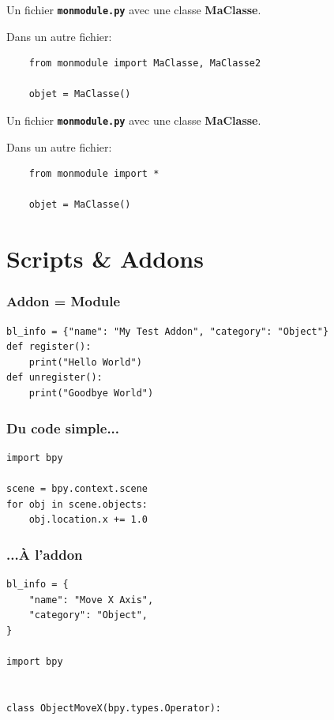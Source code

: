 \documentclass[11pt,usenames,dvipsnames]{beamer}
\begin{document}
\begin{frame}[fragile]
Un fichier \textbf{\texttt{monmodule.py}} avec une classe \textbf{MaClasse}.

Dans un autre fichier:
  \begin{lstlisting}
    from monmodule import MaClasse, MaClasse2
    
    objet = MaClasse()
  \end{lstlisting}
\end{frame}


\begin{frame}[fragile]
Un fichier \textbf{\texttt{monmodule.py}} avec une classe \textbf{MaClasse}.

Dans un autre fichier:
  \begin{lstlisting}
    from monmodule import *
    
    objet = MaClasse()
  \end{lstlisting}
\end{frame}

\section{Scripts \& Addons}
\begin{frame}[fragile]
  \frametitle{Addon = Module}
  \begin{lstlisting}
bl_info = {"name": "My Test Addon", "category": "Object"}
def register():
    print("Hello World")
def unregister():
    print("Goodbye World")
  \end{lstlisting}
\end{frame}

\begin{frame}[fragile]
  \frametitle{Du code simple...}
  \begin{lstlisting}
import bpy

scene = bpy.context.scene
for obj in scene.objects:
    obj.location.x += 1.0
  \end{lstlisting}
\end{frame}

\begin{frame}[fragile]
  \frametitle{...À l'addon}
  \begin{lstlisting}
bl_info = {
    "name": "Move X Axis",
    "category": "Object",
}

import bpy


class ObjectMoveX(bpy.types.Operator):
  \end{lstlisting}
\end{frame}
\end{document}
